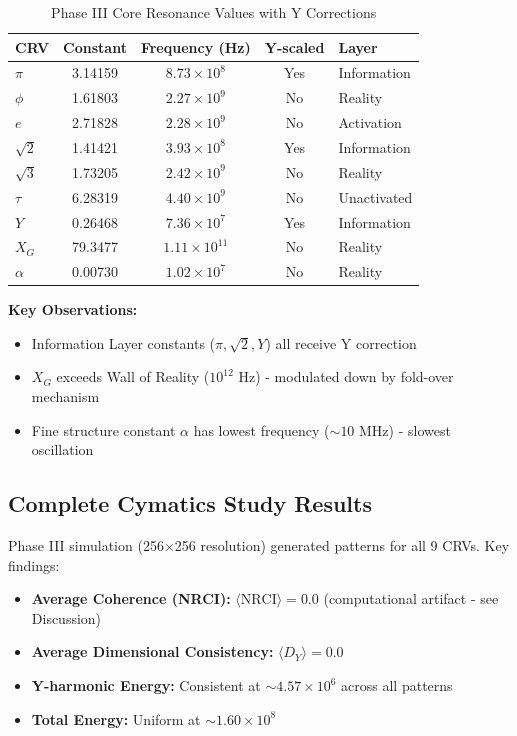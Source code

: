 \documentclass[11pt,a4paper]{article}
\begin{document}
\begin{table}[H]
\centering
\caption{Phase III Core Resonance Values with Y Corrections}
\begin{tabular}{@{}lcccl@{}}
\toprule
CRV & Constant & Frequency (Hz) & Y-scaled & Layer \\ \midrule
$\pi$ & 3.14159 & $8.73 \times 10^8$ & Yes & Information \\
$\phi$ & 1.61803 & $2.27 \times 10^9$ & No & Reality \\
$e$ & 2.71828 & $2.28 \times 10^9$ & No & Activation \\
$\sqrt{2}$ & 1.41421 & $3.93 \times 10^8$ & Yes & Information \\
$\sqrt{3}$ & 1.73205 & $2.42 \times 10^9$ & No & Reality \\
$\tau$ & 6.28319 & $4.40 \times 10^9$ & No & Unactivated \\
$Y$ & 0.26468 & $7.36 \times 10^7$ & Yes & Information \\
$X_G$ & 79.3477 & $1.11 \times 10^{11}$ & No & Reality \\
$\alpha$ & 0.00730 & $1.02 \times 10^7$ & No & Reality \\
\bottomrule
\end{tabular}
\label{tab:crvs_phase_iii}
\end{table}

\textbf{Key Observations:}
\begin{itemize}
    \item Information Layer constants ($\pi, \sqrt{2}, Y$) all receive Y correction
    \item $X_G$ exceeds Wall of Reality ($10^{12}$ Hz) - modulated down by fold-over mechanism
    \item Fine structure constant $\alpha$ has lowest frequency ($\sim 10$ MHz) - slowest oscillation
\end{itemize}

\subsection{Complete Cymatics Study Results}

Phase III simulation (256×256 resolution) generated patterns for all 9 CRVs. Key findings:

\begin{itemize}
    \item \textbf{Average Coherence (NRCI):} $\langle \text{NRCI} \rangle = 0.0$ (computational artifact - see Discussion)
    \item \textbf{Average Dimensional Consistency:} $\langle D_Y \rangle = 0.0$
    \item \textbf{Y-harmonic Energy:} Consistent at $\sim 4.57 \times 10^6$ across all patterns
    \item \textbf{Total Energy:} Uniform at $\sim 1.60 \times 10^8$
\end{itemize}
\end{document}
